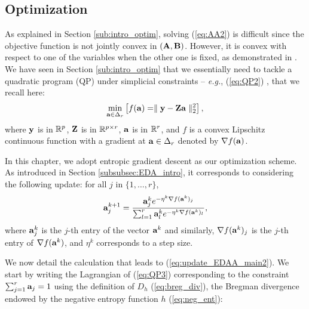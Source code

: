 \subsection{Optimization}
\label{subsec:optim}
As explained in Section \ref{sub:intro_optim}, solving (\ref{eq:AA2}) is difficult since the objective function is not jointly convex in $(\mathbf A, \mathbf B)$.
However, it is convex with respect to one of the variables when the other one is fixed, as demonstrated in \cite{morup_archetypal_2012}.
We have seen in Section \ref{sub:intro_optim} that we essentially need to tackle a quadratic program (QP) under simplicial constraints -- \emph{e.g.}, (\ref{eq:QP2}) , that we recall here:
\begin{equation}
    \label{eq:QP3}
    \min_{\mathbf a \in \Delta_r} \left[f(\mathbf a) = \parallel \mathbf y - \mathbf Z \mathbf a \parallel_2^2\right],
\end{equation}
where $\mathbf y$ is in $\mathbb R^p$, $\mathbf Z$ is in $\mathbb R^{p \times r}$, $\mathbf a$ is in $\mathbb R^r$, and $f$ is a convex Lipschitz continuous function with a gradient at $\mathbf a \in \Delta_r$ denoted by $\nabla f(\mathbf a)$.

In this chapter, we adopt entropic gradient descent as our optimization scheme.
As introduced in Section \ref{subsubsec:EDA_intro}, it corresponds to considering the following update: for all $j$ in $\{1, \ldots, r\}$,
\begin{equation}
    \label{eq:update_EDAA_main2}
    \mathbf a_j^{k+1} = \frac{\mathbf a_j^k e^{-\eta^k \nabla f (\mathbf a^k)_j}}{\sum_{l=1}^r \mathbf a_l^k e^{-\eta^k \nabla f (\mathbf a^k)_l}},
\end{equation}
where $\mathbf a_j^k$ is the $j$-th entry of the vector $\mathbf a^k$ and similarly, $\nabla f(\mathbf a^k)_j$ is the $j$-th entry of $\nabla f(\mathbf a^k)$, and $\eta^k$ corresponds to a step size.

We now detail the calculation that leads to (\ref{eq:update_EDAA_main2}).
We start by writing the Lagrangian of (\ref{eq:QP3}) corresponding to the constraint $\sum_{j=1}^r \mathbf a_j = 1$ using the definition of $D_h$ (\ref{eq:breg_div}), the Bregman divergence \cite{bregman_relaxation_1967} endowed by the negative entropy function $h$ (\ref{eq:neg_ent}):

